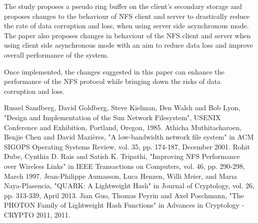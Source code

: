\documentclass[conference]{IEEEtran}
\begin{document}
The study proposes a pseudo ring buffer on the client's secondary storage
and proposes changes to the behaviour of NFS client and server to 
drastically reduce the rate of data corruption and loss, when using server
side asynchronous mode. The paper also proposes changes in behaviour of the
NFS client and server when using client side asynchronous mode with an aim 
to reduce data loss and improve overall performance of the system.

Once implemented, the changes suggested in this paper can enhance the
performance of the NFS protocol while bringing down the risks of data
corruption and loss.

\begin{thebibliography}{00}
 Russel Sandberg, David Goldberg, Steve Kielman, Den Walsh and Bob Lyon, "Design and Implementation of the Sun Network Filesystem", USENIX Conference and Exhibition, Portland, Oregon, 1985.
 Athicha Muthitacharoen, Benjie Chen and David Mazières, "A low-bandwidth network file system" in ACM SIGOPS Operating Systems Review, vol. 35, pp. 174-187, December 2001.
 Rohit Dube, Cynthia D. Rais and Satish K. Tripathi, "Improving NFS Performance over Wireless Links" in IEEE Transactions on Computers, vol. 46, pp. 290-298, March 1997.
 Jean-Philippe Aumasson, Luca Henzen, Willi Meier, and Marıa Naya-Plasencia, "QUARK: A Lightweight Hash" in Journal of Cryptology, vol. 26, pp. 313-339, April 2013.
Jian Guo, Thomas Peyrin and Axel Poschmann, "The PHOTON Family of Lightweight Hash Functions" in Advances in Cryptology - CRYPTO 2011, 2011.

\end{thebibliography}
\end{document}
